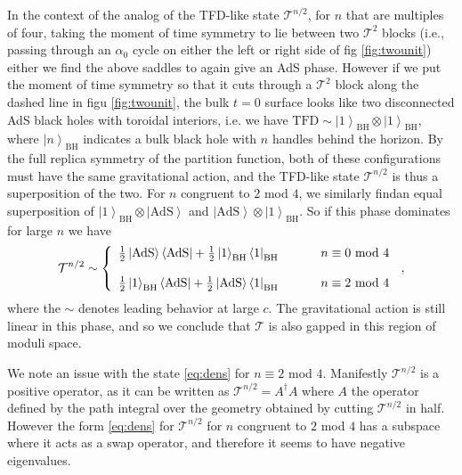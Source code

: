 \documentclass[letterpaper,12pt]{article}
\newcommand{\ban}[1]{\begin{align}#1\end{align}}
\newcommand{\ket}[1]{\left| #1\right>}
\newcommand{\bra}[1]{\left< #1\right|}
\begin{document}
In the context of the analog of the TFD-like state $\mathcal T^{n/2}$, for $n$ that are multiples of four, taking the moment of time symmetry to lie between two $\mathcal T^2$ blocks (i.e., passing through an $\alpha_0$ cycle on either the left or right side of fig \ref{fig:twounit}) either we find the above saddles to again give an AdS phase. However if we put the moment of time symmetry so that it cuts through a $\mathcal T^2$ block along the dashed line in figu \ref{fig:twounit}, the bulk $t=0$ surface looks like two disconnected AdS black holes with toroidal interiors, i.e. we have $\text{TFD} \sim \ket 1_\text{BH}\otimes \ket 1_\text{BH}$, where $\ket{n}_\text{BH}$ indicates a bulk black hole with $n$ handles behind the horizon. By the full replica symmetry of the partition function, both of these configurations must have the same gravitational action, and the TFD-like state $\mathcal T^{n/2}$ is thus a superposition of the two. For  $n$ congruent to $2$ mod $4$, we similarly findan equal superposition of $\ket 1_\text{BH} \otimes \ket{\text{AdS}}$ and $\ket{\text{AdS}}\otimes \ket 1_\text{BH} $. So if this phase dominates for large $n$ we have
\ban{
\mathcal T^{n/2}\sim \left \{ \begin{array}{ccc} \frac 12 \ket{\text{AdS}}\bra{\text{AdS}}+\frac 12 \ket 1 _\text{BH} \bra 1_\text{BH}& \hspace{0.5cm} & n \equiv 0 \text{ mod } 4 \\
\\
\frac 12 \ket{1}_\text{BH} \bra{\text{AdS}}+\frac 12 \ket{\text{AdS}} \bra 1_\text{BH} & \hspace{0.5cm}& n \equiv 2 \text{ mod } 4 
\end{array}
 \right. \, \label{eq:dens},
}
where the $\sim$ denotes leading behavior at large $c$.
The gravitational action is still linear in this phase, and so we conclude that $\mathcal T$ is also gapped in this region of moduli space.

We note an issue with the state \eqref{eq:dens} for $n\equiv 2$ mod $4$. Manifestly $\mathcal T^{n/2}$ is a positive operator, as it can be written as $\mathcal T^{n/2} = A^\dag A$ where $A$ the operator defined by the path integral over the geometry obtained by cutting $\mathcal T^{n/2}$ in half. However the form \eqref{eq:dens} for $\mathcal T^{n/2}$ for $n$ congruent to $2$ mod $4$ has a subspace where it acts as a swap operator, and therefore it seems to have negative eigenvalues.
\end{document}
